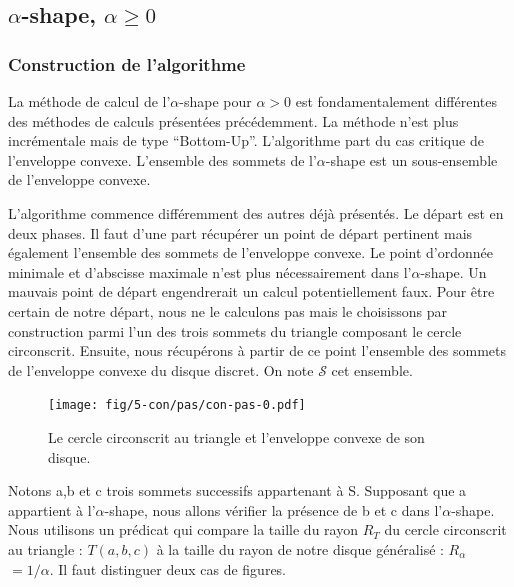 \subsection{$\alpha$-shape, $\alpha \geq 0$}

\subsubsection{Construction de l'algorithme}

La méthode de calcul de l'$\alpha$-shape pour $\alpha > 0$ est fondamentalement différentes des méthodes de calculs présentées précédemment. La méthode n'est plus incrémentale mais de type ``Bottom-Up''. L'algorithme part du cas critique de l'enveloppe convexe. L'ensemble des sommets de l'$\alpha$-shape est un sous-ensemble de l'enveloppe convexe. 

L'algorithme commence différemment des autres déjà présentés. Le départ est en deux phases. Il faut d'une part récupérer un point de départ pertinent mais également l'ensemble des sommets de l'enveloppe convexe. Le point d'ordonnée minimale et d'abscisse maximale n'est plus nécessairement dans l'$\alpha$-shape. Un mauvais point de départ engendrerait un calcul potentiellement faux. Pour être certain de notre départ, nous ne le calculons pas mais le choisissons par construction parmi l'un des trois sommets du triangle composant le cercle circonscrit. Ensuite, nous récupérons à partir de ce point l'ensemble des sommets de l'enveloppe convexe du disque discret. On note $\mathcal{S}$ cet ensemble.

\begin{figure}[H]
  \centering
  \texttt{[image: fig/5-con/pas/con-pas-0.pdf]}
  \caption{Le cercle circonscrit au triangle et l'enveloppe convexe de son disque.}
\end{figure}


Notons a,b et c trois sommets successifs appartenant à S. Supposant que a appartient à l'$\alpha$-shape, nous allons vérifier la présence de b et c dans l'$\alpha$-shape. Nous utilisons un prédicat qui compare la taille du rayon \textbf{$R_T$} du cercle circonscrit au triangle : $T(a, b, c)$ à la taille du rayon de notre disque généralisé : \textbf{$R_{\alpha}$} $= 1/\alpha$. Il faut distinguer deux cas de figures.\\

